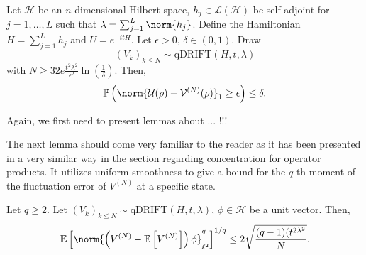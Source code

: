 \begin{thm}
\label{averagecaseconc}
    Let \( \mathcal{H} \) be an \( n \)-dimensional Hilbert space, \( h_j \in \mathcal{L}(\mathcal{H}) \) be self-adjoint for \( j = 1, \dots, L \) such that \( \lambda= \sum_{j=1}^{L} \norm{h_j}_{} \). Define the Hamiltonian \( H=\sum_{j=1}^{L}h_j \) and \( U=e^{-itH} \). Let \( \epsilon>0,\, \delta \in (0,1) \). Draw 
    \[ (V_k)_{k\leq N} \sim \text{qDRIFT}(H,t,\lambda) \]
    with \( N \geq 32 e \frac{t^{2}\lambda^{2}}{\epsilon^{2}} \operatorname{ln}\left(\frac{1}{\delta}\right)\).
    Then,
    \[ \mathbb{P}\left(\norm{\mathcal{U}(\rho)-\mathcal{V}^{(N)}(\rho)}_{1}\geq \epsilon\right) \leq \delta .\]
\end{thm}

Again, we first need to present lemmas about ... !!!

The next lemma should come very familiar to the reader as it has been presented in a very similar way in the section regarding concentration for operator products. It utilizes uniform smoothness to give a bound for the \( q \)-th moment of the fluctuation error of \( V^{(N)} \) at a specific state.
\begin{lem}[]
  \label{smoothnessforvectors}
  Let \( q \geq 2 \). Let \( (V_k)_{k\leq N}\sim \text{qDRIFT}(H,t,\lambda) \), \( \phi \in \mathcal{H} \) be a unit vector. Then,
  \[ \mathbb{E}\left[ \norm{\left(V^{(N)}-\mathbb{E}\left[V^{(N)}\right]\right)\phi}_{\ell^{2}}^{q}\right]^{1/q} \leq 2 \sqrt{ \frac{(q-1)(t^{2 \lambda^{2}}}{N} }. \]
\end{lem}

